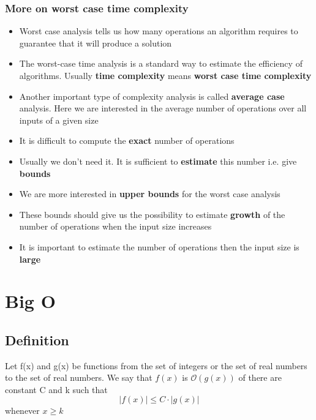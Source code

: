 \documentclass{article}[18pt]
\begin{document}
\subsubsection{More on worst case time complexity}
\begin{itemize}
	\item Worst case analysis tells us how many operations an algorithm requires to guarantee that it will produce a solution
	\item The worst-case time analysis is a standard way to estimate the efficiency of algorithms. Usually \textbf{time complexity} means \textbf{worst case time complexity}
	\item Another important type of complexity analysis is called \textbf{average case} analysis. Here we are interested in the average number of operations over all inputs of a given size
	\item It is difficult to compute the \textbf{exact} number of operations
	\item Usually we don't need it. It is sufficient to \textbf{estimate} this number i.e. give \textbf{bounds}
	\item We are more interested in \textbf{upper bounds} for the worst case analysis
	\item These bounds should give us the possibility to estimate \textbf{growth} of the number of operations when the input size increases
	\item It is important to estimate the number of operations then the input size is \textbf{large}
\end{itemize}
\section{Big O}
\subsection{Definition}
Let f(x) and g(x) be functions from the set of integers or the set of real numbers to the set of real numbers. We say that $f(x)$ is $\mathcal{O}(g(x))$ of there are constant C and k such that
$$| f ( x ) | \leq C \cdot | g ( x ) |$$
whenever $x\geqslant k$
\end{document}
